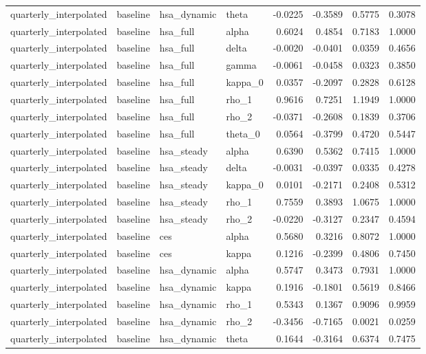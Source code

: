 \begin{tabular}{llllrrrr}
quarterly\_interpolated & baseline & hsa\_dynamic & theta & -0.0225 & -0.3589 & 0.5775 & 0.3078 \\
quarterly\_interpolated & baseline & hsa\_full & alpha & 0.6024 & 0.4854 & 0.7183 & 1.0000 \\
quarterly\_interpolated & baseline & hsa\_full & delta & -0.0020 & -0.0401 & 0.0359 & 0.4656 \\
quarterly\_interpolated & baseline & hsa\_full & gamma & -0.0061 & -0.0458 & 0.0323 & 0.3850 \\
quarterly\_interpolated & baseline & hsa\_full & kappa\_0 & 0.0357 & -0.2097 & 0.2828 & 0.6128 \\
quarterly\_interpolated & baseline & hsa\_full & rho\_1 & 0.9616 & 0.7251 & 1.1949 & 1.0000 \\
quarterly\_interpolated & baseline & hsa\_full & rho\_2 & -0.0371 & -0.2608 & 0.1839 & 0.3706 \\
quarterly\_interpolated & baseline & hsa\_full & theta\_0 & 0.0564 & -0.3799 & 0.4720 & 0.5447 \\
quarterly\_interpolated & baseline & hsa\_steady & alpha & 0.6390 & 0.5362 & 0.7415 & 1.0000 \\
quarterly\_interpolated & baseline & hsa\_steady & delta & -0.0031 & -0.0397 & 0.0335 & 0.4278 \\
quarterly\_interpolated & baseline & hsa\_steady & kappa\_0 & 0.0101 & -0.2171 & 0.2408 & 0.5312 \\
quarterly\_interpolated & baseline & hsa\_steady & rho\_1 & 0.7559 & 0.3893 & 1.0675 & 1.0000 \\
quarterly\_interpolated & baseline & hsa\_steady & rho\_2 & -0.0220 & -0.3127 & 0.2347 & 0.4594 \\
quarterly\_interpolated & baseline & ces & alpha & 0.5680 & 0.3216 & 0.8072 & 1.0000 \\
quarterly\_interpolated & baseline & ces & kappa & 0.1216 & -0.2399 & 0.4806 & 0.7450 \\
quarterly\_interpolated & baseline & hsa\_dynamic & alpha & 0.5747 & 0.3473 & 0.7931 & 1.0000 \\
quarterly\_interpolated & baseline & hsa\_dynamic & kappa & 0.1916 & -0.1801 & 0.5619 & 0.8466 \\
quarterly\_interpolated & baseline & hsa\_dynamic & rho\_1 & 0.5343 & 0.1367 & 0.9096 & 0.9959 \\
quarterly\_interpolated & baseline & hsa\_dynamic & rho\_2 & -0.3456 & -0.7165 & 0.0021 & 0.0259 \\
quarterly\_interpolated & baseline & hsa\_dynamic & theta & 0.1644 & -0.3164 & 0.6374 & 0.7475 \\

\end{tabular}
